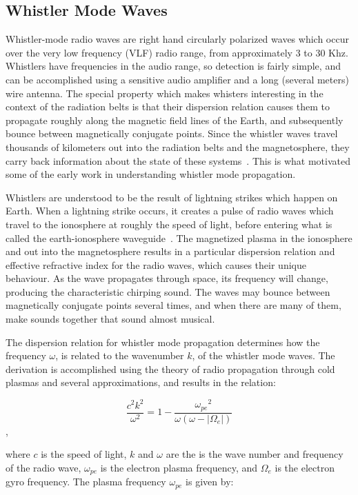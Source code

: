 \subsection{Whistler Mode Waves}

Whistler-mode radio waves are right hand circularly polarized waves which occur over the very low frequency (VLF) radio range, from approximately 3 to 30 Khz. Whistlers have frequencies in the audio range, so detection is fairly simple, and can be accomplished using a sensitive audio amplifier and a long (several meters) wire antenna. The special property which makes whisters interesting in the context of the radiation belts is that their dispersion relation causes them to propagate roughly along the magnetic field lines of the Earth, and subsequently bounce between magnetically conjugate points. Since the whistler waves travel thousands of kilometers out into the radiation belts and the magnetosphere, they carry back information about the state of these systems~\citep{ratcliffe66}. This is what motivated some of the early work in understanding whistler mode propagation. 

Whistlers are understood to be the result of lightning strikes which happen on Earth. When a lightning strike occurs, it creates a pulse of radio waves which travel to the ionosphere at roughly the speed of light, before entering what is called the earth-ionosphere waveguide~\cite{ratcliffe66}. The magnetized plasma in the ionosphere and out into the magnetosphere results in a particular dispersion relation and effective refractive index for the radio waves, which causes their unique behaviour. As the wave propagates through space, its frequency will change, producing the characteristic chirping sound. The waves may bounce between magnetically conjugate points several times, and when there are many of them, make sounds together that sound almost musical. 

The dispersion relation for whistler mode propagation determines how the frequency $\omega$, is related to the wavenumber $k$, of the whistler mode waves. The derivation is accomplished using the theory of radio propagation through cold plasmas and several approximations, and results in the relation:

$$\frac{c^2k^2}{\omega^2} = 1 - \frac{{\omega_{pe}}^2}{\omega(\omega - |\Omega_e|)}$$,

where $c$ is the speed of light, $k$ and $\omega$ are the is the wave number and frequency of the radio wave, $\omega_{pe}$ is the electron plasma frequency, and $\Omega_e$ is the electron gyro frequency. The plasma frequency $\omega_{pe}$ is given by:

